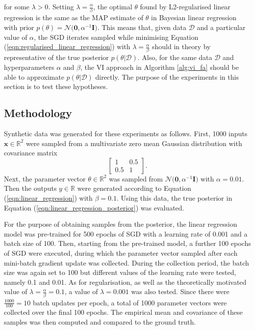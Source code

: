 \documentclass[msc,deptreport.inf]{infthesis} %
\newcommand{\matr}[1]{\mathbf{#1}}
\newcommand{\R}{\mathbb R}
\begin{document}
for some $\lambda > 0$. Setting $\lambda = \frac{\alpha}{\beta}$, the optimal $\theta$ found by L2-regularised linear regression is the same as the MAP estimate of $\theta$ in Bayesian linear regression with prior $p(\theta) = \mathcal{N}\big(\matr{0}, \alpha^{-1} \matr{I} \big)$. This means that, given data $\mathcal{D}$ and a particular value of $\alpha$, the SGD iterates sampled while minimising Equation (\ref{eqn:regularised_linear_regression}) with $\lambda = \frac{\alpha}{\beta}$ should in theory by representative of the true posterior $p(\theta | \mathcal{D})$. Also, for the same data $\mathcal{D}$ and hyperparameters $\alpha$ and $\beta$, the VI approach in Algorithm \ref{alg:vi_fa} should be able to approximate $p(\theta | \mathcal{D})$ directly. The purpose of the experiments in this section is to test these hypotheses. 
 
\subsection{Methodology}

Synthetic data was generated for these experiments as follows. First, 1000 inputs $\matr{x} \in \R^2$ were sampled from a multivariate zero mean Gaussian distribution with covariance matrix
\begin{equation}
	\begin{bmatrix}
		1 & 0.5 \\
		0.5 & 1
	\end{bmatrix}.
\end{equation}
Next, the parameter vector $\theta \in \R^2$ was sampled from $\mathcal{N}\big(\matr{0}, \alpha^{-1} \matr{I} \big)$ with $\alpha = 0.01$. Then the outputs $y \in \R$ were generated according to Equation (\ref{eqn:linear_regression}) with $\beta = 0.1$. Using this data, the true posterior in Equation (\ref{eqn:linear_regression_posterior}) was evaluated. 

For the purpose of obtaining samples from the posterior, the linear regression model was pre-trained for 500 epochs of SGD with a learning rate of 0.001 and a batch size of 100. Then, starting from the pre-trained model, a further 100 epochs of SGD were executed, during which the parameter vector sampled after each mini-batch gradient update was collected. During the collection period, the batch size was again set to 100 but different values of the learning rate were tested, namely 0.1 and 0.01. As for regularisation, as well as the theoretically motivated value of $\lambda = \frac{\alpha}{\beta} = 0.1$, a value of $\lambda = 0.001$ was also tested. Since there were $\frac{1000}{100} = 10$ batch updates per epoch, a total of 1000 parameter vectors were collected over the final 100 epochs. The empirical mean and covariance of these samples was then computed and compared to the ground truth. 
\end{document}

